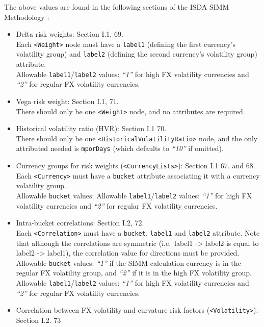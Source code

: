 The above values are found in the following sections of the ISDA SIMM Methodology \cite{SIMM2.6}:
\begin{itemize}
  \item Delta risk weights: Section I.1, 69. \\
    Each {\tt <Weight>} node must have a {\tt label1} (defining the first currency's volatility group) and {\tt label2}
    (defining the second currency's volatility group) attribute. \\
    Allowable {\tt label1}/{\tt label2} values: \emph{``1''} for high FX volatility currencies and \emph{``2''}
    for regular FX volatility currencies.
  \item Vega risk weight: Section I.1, 71. \\
    There should only be one {\tt <Weight>} node, and no attributes are required.
  \item Historical volatility ratio (HVR): Section I.1 70. \\
    There should only be one {\tt <HistoricalVolatilityRatio>} node, and the only attributed needed is {\tt mporDays}
    (which defaults to \emph{``10''} if omitted).
  \item Currency groups for risk weights ({\tt <CurrencyLists>}): Section I.1 67. and 68. \\
    Each {\tt <Currency>} must have a {\tt bucket} attribute associating it with a currency volatility group. \\
    Allowable {\tt bucket} values: Allowable {\tt label1}/{\tt label2} values: \emph{``1''} for high FX volatility
    currencies and \emph{``2''} for regular FX volatility currencies.
  \item Intra-bucket correlations: Section I.2, 72. \\
    Each {\tt <Correlation>} must have a {\tt bucket}, {\tt label1} and {\tt label2} attribute. Note that although the
    correlations are symmetric (i.e.\ label1 -> label2 is equal to label2 -> label1), the correlation value for
    directions must be provided. \\
    Allowable {\tt bucket} values: \emph{``1''} if the SIMM calculation currency is in the regular FX volatility group, and \emph{``2''} if it is in the high FX volatility group. \\
    Allowable {\tt label1}/{\tt label2} values: \emph{``1''} for high FX volatility currencies and \emph{``2''}
    for regular FX volatility currencies.
  \item Correlation between FX volatility and curvature risk factors ({\tt <Volatility>}): Section I.2. 73

\end{itemize}

